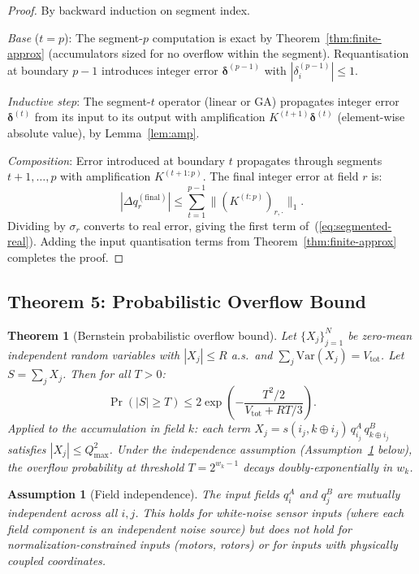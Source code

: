 \documentclass[11pt,a4paper]{article}
\theoremstyle{definition}
\theoremstyle{plain}
\newtheorem{theorem}{Theorem}[section]
\newtheorem{assumption}{Assumption}[section]
\theoremstyle{remark}
\newcommand{\bv}[1]{\mathbf{#1}}
\newcommand{\Var}{\mathrm{Var}}
\begin{document}
\begin{proof}
By backward induction on segment index.

\emph{Base} ($t = p$): The segment-$p$ computation is exact by
Theorem~\ref{thm:finite-approx} (accumulators sized for no overflow
within the segment).
Requantisation at boundary $p-1$ introduces integer error
$\bv{\delta}^{(p-1)}$ with $|\delta_i^{(p-1)}| \le 1$.

\emph{Inductive step}: The segment-$t$ operator (linear or GA)
propagates integer error $\bv{\delta}^{(t)}$ from its input to its
output with amplification $K^{(t+1)}\bv{\delta}^{(t)}$
(element-wise absolute value), by Lemma~\ref{lem:amp}.

\emph{Composition}: Error introduced at boundary $t$ propagates through
segments $t+1, \ldots, p$ with amplification $K^{(t+1:p)}$.
The final integer error at field $r$ is:
\[
  |\Delta q_r^{(\mathrm{final})}|
  \le \sum_{t=1}^{p-1} \|(K^{(t:p)})_{r,\cdot}\|_1.
\]
Dividing by $\sigma_r$ converts to real error, giving the first term
of~(\ref{eq:segmented-real}).
Adding the input quantisation terms from Theorem~\ref{thm:finite-approx}
completes the proof.
\end{proof}

\subsection{Theorem 5: Probabilistic Overflow Bound}
\label{sec:prob}

\begin{theorem}[Bernstein probabilistic overflow bound]
\label{thm:prob}
Let $\{X_j\}_{j=1}^N$ be zero-mean independent random variables with
$|X_j| \le R$ a.s.\ and $\sum_j \Var(X_j) = V_{\mathrm{tot}}$.
Let $S = \sum_j X_j$.
Then for all $T > 0$:
\begin{equation}\label{eq:bernstein}
  \Pr(|S| \ge T)
  \le 2\exp\!\left(-\frac{T^2/2}{V_{\mathrm{tot}} + RT/3}\right).
\end{equation}
Applied to the accumulation in field $k$:
each term $X_j = s(i_j,k\oplus i_j)\,q_{i_j}^A\,q_{k\oplus i_j}^B$
satisfies $|X_j| \le Q_{\max}^2$.
Under the independence assumption
(Assumption~\ref{ass:independence} below),
the overflow probability at threshold $T = 2^{w_k-1}$ decays
doubly-exponentially in $w_k$.
\end{theorem}

\begin{assumption}[Field independence]
\label{ass:independence}
The input fields $q_i^A$ and $q_j^B$ are mutually independent across
all $i, j$.
This holds for white-noise sensor inputs (where each field component is
an independent noise source) but does \emph{not} hold for
normalization-constrained inputs (motors, rotors) or for inputs with
physically coupled coordinates.
\end{assumption}
\end{document}

